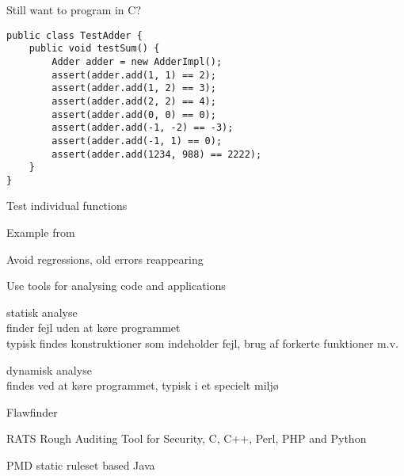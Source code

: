 \documentclass[Screen16to9,17pt]{foils}
\begin{document}
\vskip 2cm
\centerline{\Large Still want to program in C?}






\begin{verbatim}
public class TestAdder {
    public void testSum() {
        Adder adder = new AdderImpl();
        assert(adder.add(1, 1) == 2);
        assert(adder.add(1, 2) == 3);
        assert(adder.add(2, 2) == 4);
        assert(adder.add(0, 0) == 0);
        assert(adder.add(-1, -2) == -3);
        assert(adder.add(-1, 1) == 0);
        assert(adder.add(1234, 988) == 2222);
    }
}
\end{verbatim}

\begin{list1}
\item Test individual functions
\item Example from 
\item Avoid regressions, old errors reappearing
\end{list1}



\centerline{Use tools for analysing code and applications}


\begin{list1}
\item  {\Large statisk analyse}\\
finder fejl uden at køre programmet\\
typisk findes konstruktioner som indeholder fejl, brug af forkerte funktioner m.v.
\item {\Large dynamisk analyse}\\
findes ved at køre programmet, typisk i et specielt miljø
\end{list1}

\begin{list1}
\item Flawfinder 
\item RATS Rough Auditing Tool for Security, C, C++, Perl, PHP and Python
\item PMD static ruleset based Java
\item {\small {}}
\end{list1}
\end{document}
